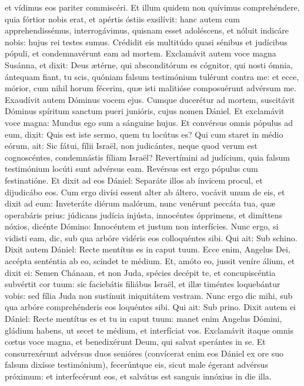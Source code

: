 \begin{paracol}{2}
{et vídimus eos pariter commiscéri. Et illum quidem non quívimus comprehéndere, quia fórtior nobis erat, et apértis óstiis exsilívit: hanc autem cum apprehendissémus, interrogávimus, quisnam esset adoléscens, et nóluit indicáre nobis: hujus rei testes sumus. Crédidit eis multitúdo quasi sénibus et judícibus pópuli, et condemnavérunt eam ad mortem. Exclamávit autem voce magna Susánna, et dixit: Deus ætérne, qui absconditórum es cógnitor, qui nosti ómnia, ántequam fiant, tu scis, quóniam falsum testimónium tulérunt contra me: et ecce, mórior, cum nihil horum fécerim, quæ isti malitióse composuérunt advérsum me. Exaudívit autem Dóminus vocem ejus. Cumque ducerétur ad mortem, suscitávit Dóminus spíritum sanctum pueri junióris, cujus nomen Dániel. Et exclamávit voce magna: Mundus ego sum a sánguine hujus. Et convérsus omnis pópulus ad eum, dixit: Quis est iste sermo, quem tu locútus es? Qui cum staret in médio eórum, ait: Sic fátui, fílii Israël, non judicántes, neque quod verum est cognoscéntes, condemnástis fíliam Israël? Revertímini ad judícium, quia falsum testimónium locúti sunt advérsus eam. Revérsus est ergo pópulus cum festinatióne. Et dixit ad eos Dániel: Separáte illos ab ínvicem procul, et dijudicábo eos. Cum ergo divísi essent alter ab áltero, vocávit unum de eis, et dixit ad eum: Inveteráte diérum malórum, nunc venérunt peccáta tua, quæ operabáris prius: júdicans judícia injústa, innocéntes ópprimens, et dimíttens nóxios, dicénte Dómino: Innocéntem et justum non interfícies. Nunc ergo, si vidisti eam, dic, sub qua arbóre vidéris eos colloquéntes sibi. Qui ait: Sub schino. Dixit autem Dániel: Recte mentítus es in caput tuum. Ecce enim, Angelus Dei, accépta senténtia ab eo, scindet te médium. Et, amóto eo, jussit veníre álium, et dixit ei: Semen Chánaan, et non Juda, spécies decépit te, et concupiscéntia subvértit cor tuum: sic faciebátis filiábus Israël, et illæ timéntes loquebántur vobis: sed fília Juda non sustínuit iniquitátem vestram. Nunc ergo dic mihi, sub qua arbóre comprehénderis eos loquéntes sibi. Qui ait: Sub prino. Dixit autem ei Dániel: Recte mentítus es et tu in caput tuum: manet enim Angelus Dómini, gládium habens, ut secet te médium, et interfíciat vos. Exclamávit itaque omnis cœtus voce magna, et benedixérunt Deum, qui salvat sperántes in se. Et consurrexérunt advérsus duos senióres (convícerat enim eos Dániel ex ore suo falsum dixísse testimónium), fecerúntque eis, sicut male égerant advérsus próximum: et interfecérunt eos, et salvátus est sanguis innóxius in die illa.
}\switchcolumn\portugues{
}
\end{paracol}
